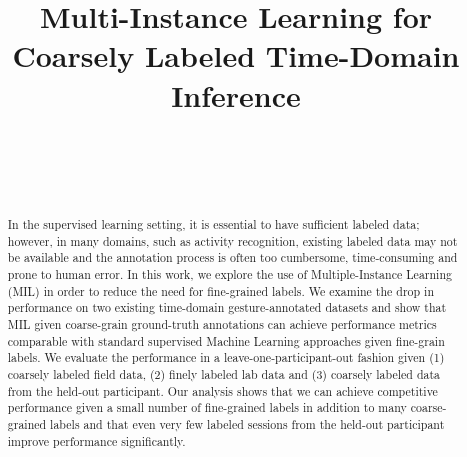 \documentclass{sigchi}
\begin{document}
\title{Multi-Instance Learning for Coarsely Labeled Time-Domain Inference}

\author{%
  \\
  \\
  \\
}

\maketitle

\begin{abstract}
  In the supervised learning setting, it is essential to have sufficient labeled data; however, in many domains, such as activity recognition, existing labeled data may not be available and the annotation process is often too cumbersome, time-consuming and prone to human error. In this work, we explore the use of Multiple-Instance Learning (MIL) in order to reduce the need for fine-grained labels. We examine the drop in performance on two existing time-domain gesture-annotated datasets and show that MIL given coarse-grain ground-truth annotations can achieve performance metrics comparable with standard supervised Machine Learning approaches given fine-grain labels. We evaluate the performance in a leave-one-participant-out fashion given (1) coarsely labeled field data, (2) finely labeled lab data and (3) coarsely labeled data from the held-out participant. Our analysis shows that we can achieve competitive performance given a small number of fine-grained labels in addition to many coarse-grained labels and that even very few labeled sessions from the held-out participant improve performance significantly.
\end{abstract}

\end{document}
